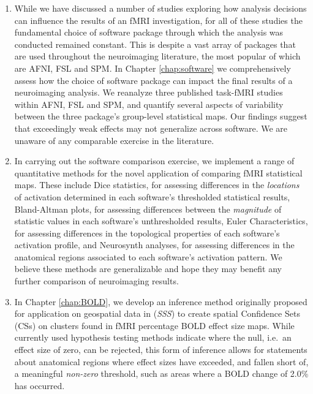 \begin{enumerate}

\item While we have discussed a number of studies exploring how analysis decisions can influence the results of an fMRI investigation, for all of these studies the fundamental choice of software package through which the analysis was conducted remained constant. This is despite a vast array of packages that are used throughout the neuroimaging literature, the most popular of which are AFNI, FSL and SPM. In Chapter \ref{chap:software} we comprehensively assess how the choice of software package can impact the final results of a neuroimaging analysis. We reanalyze three published task-fMRI studies within AFNI, FSL and SPM, and quantify several aspects of variability between the three package's group-level statistical maps. Our findings suggest that exceedingly weak effects may not generalize across software. We are unaware of any comparable exercise in the literature.  

\item In carrying out the software comparison exercise, we implement a range of quantitative methods for the novel application of comparing fMRI statistical maps. These include Dice statistics, for assessing differences in the \textit{locations} of activation determined in each software's thresholded statistical results, Bland-Altman plots, for assessing differences between the \textit{magnitude} of statistic values in each software's unthresholded results, Euler Characteristics, for assessing differences in the topological properties of each software's activation profile, and Neurosynth analyses, for assessing differences in the anatomical regions associated to each software's activation pattern. We believe these methods are generalizable and hope they may benefit any further comparison of neuroimaging results. 

\item In Chapter \ref{chap:BOLD}, we develop an inference method originally proposed for application on geospatial data in \citet*{Sommerfeld2018-zl} (\textit{SSS}) to create spatial Confidence Sets (CSs) on clusters found in fMRI percentage BOLD effect size maps. While currently used hypothesis testing methods indicate where the null, i.e.\ an effect size of zero, can be rejected, this form of inference allows for statements about anatomical regions where effect sizes have exceeded, and fallen short of, a meaningful \textit{non-zero} threshold, such as areas where a BOLD change of 2.0\% has occurred. 


\end{enumerate}
